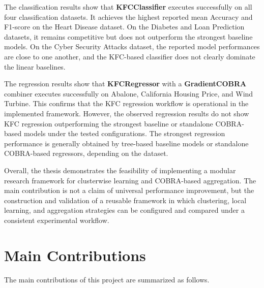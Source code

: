 The classification results show that \textbf{KFCClassifier} executes successfully on all four classification datasets. It achieves the highest reported mean Accuracy and F1-score on the Heart Disease dataset. On the Diabetes and Loan Prediction datasets, it remains competitive but does not outperform the strongest baseline models. On the Cyber Security Attacks dataset, the reported model performances are close to one another, and the KFC-based classifier does not clearly dominate the linear baselines.

The regression results show that \textbf{KFCRegressor} with a \textbf{GradientCOBRA} combiner executes successfully on Abalone, California Housing Price, and Wind Turbine. This confirms that the KFC regression workflow is operational in the implemented framework. However, the observed regression results do not show KFC regression outperforming the strongest baseline or standalone COBRA-based models under the tested configurations. The strongest regression performance is generally obtained by tree-based baseline models or standalone COBRA-based regressors, depending on the dataset.

Overall, the thesis demonstrates the feasibility of implementing a modular research framework for clusterwise learning and COBRA-based aggregation. The main contribution is not a claim of universal performance improvement, but the construction and validation of a reusable framework in which clustering, local learning, and aggregation strategies can be configured and compared under a consistent experimental workflow.

\section{Main Contributions}
\label{sec:main_contributions}

\hs The main contributions of this project are summarized as follows.

